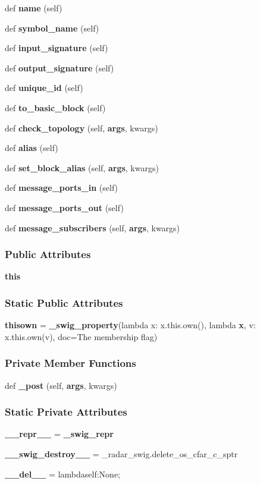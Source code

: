\begin{DoxyCompactItemize}
def {\bf name} (self)
\item 
def {\bf symbol\+\_\+name} (self)
\item 
def {\bf input\+\_\+signature} (self)
\item 
def {\bf output\+\_\+signature} (self)
\item 
def {\bf unique\+\_\+id} (self)
\item 
def {\bf to\+\_\+basic\+\_\+block} (self)
\item 
def {\bf check\+\_\+topology} (self, {\bf args}, kwargs)
\item 
def {\bf alias} (self)
\item 
def {\bf set\+\_\+block\+\_\+alias} (self, {\bf args}, kwargs)
\item 
def {\bf message\+\_\+ports\+\_\+in} (self)
\item 
def {\bf message\+\_\+ports\+\_\+out} (self)
\item 
def {\bf message\+\_\+subscribers} (self, {\bf args}, kwargs)
\end{DoxyCompactItemize}
\subsubsection*{Public Attributes}
\begin{DoxyCompactItemize}
\item 
{\bf this}
\end{DoxyCompactItemize}
\subsubsection*{Static Public Attributes}
\begin{DoxyCompactItemize}
\item 
{\bf thisown} = {\bf \+\_\+swig\+\_\+property}(lambda x\+: x.\+this.\+own(), lambda {\bf x}, v\+: x.\+this.\+own(v), doc=\textquotesingle{}The membership flag\textquotesingle{})
\end{DoxyCompactItemize}
\subsubsection*{Private Member Functions}
\begin{DoxyCompactItemize}
\item 
def {\bf \+\_\+post} (self, {\bf args}, kwargs)
\end{DoxyCompactItemize}
\subsubsection*{Static Private Attributes}
\begin{DoxyCompactItemize}
\item 
{\bf \+\_\+\+\_\+repr\+\_\+\+\_\+} = {\bf \+\_\+swig\+\_\+repr}
\item 
{\bf \+\_\+\+\_\+swig\+\_\+destroy\+\_\+\+\_\+} = \+\_\+radar\+\_\+swig.\+delete\+\_\+os\+\_\+cfar\+\_\+c\+\_\+sptr
\item 
{\bf \+\_\+\+\_\+del\+\_\+\+\_\+} = lambdaself\+:\+None;
\end{DoxyCompactItemize}


